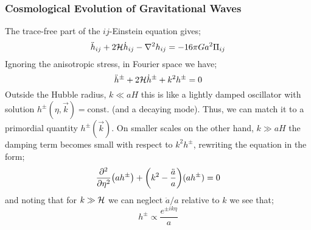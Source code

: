 \subsubsection{Cosmological Evolution of Gravitational Waves}
The trace-free part of the $ij$-Einstein equation gives;
\begin{equation}
\ddot{h}_{ij} + 2\mathcal{H} \dot{h}_{ij} - \nabla^2 h_{ij} = -16\pi Ga^2 \Pi_{ij}
\end{equation}
Ignoring the anisotropic stress, in Fourier space we have;
\begin{equation*}
\ddot{h}^{\pm} + 2\mathcal{H} \dot{h}^{\pm} + k^2 h^{\pm} = 0
\end{equation*}
Outside the Hubble radius, $k \ll aH$ this is like a lightly damped oscillator with solution $h^{\pm}(\eta, \vec{k}) = \text{const.}$ (and a decaying mode). Thus, we can match it to a primordial quantity $h^{\pm}(\vec{k})$. On smaller scales on the other hand, $k \gg aH$ the damping term becomes small with respect to $k^2 h^{\pm}$, rewriting the equation in the form;
\begin{equation*}
\frac{\del^2}{\del \eta^2}\left(a h^{\pm}\right) + \left(k^2 - \frac{\ddot{a}}{a}\right)(ah^{\pm}) = 0
\end{equation*}
and noting that for $k \gg \mathcal{H}$ we can neglect $\ddot{a}/a$ relative to $k$ we see that;
\begin{equation}
h^{\pm} \propto \frac{e^{\pm ik\eta}}{a}
\end{equation}
